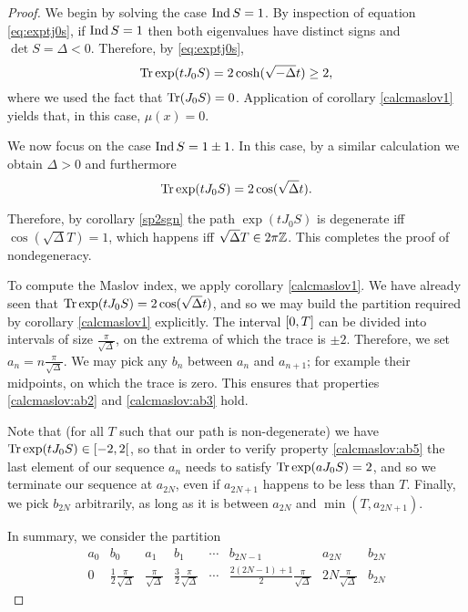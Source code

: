 \begin{proof}
We begin by solving the case $\operatorname{Ind} S = 1$. By inspection of equation \eqref{eq:exptj0s}, if $\operatorname{Ind} S = 1$ then both eigenvalues have distinct signs and $\det S = \Delta < 0$. Therefore, by \eqref{eq:exptj0s},
\begin{equation}
\operatorname{Tr} \exp(t J_0 S) = 2 \cosh(\sqrt{-\Delta} t) \geq 2,
\end{equation}
where we used the fact that $\operatorname{Tr}(J_0 S) = 0$. Application of corollary \ref{calcmaslov1} yields that, in this case, $\mu(x) = 0$.

We now focus on the case $\operatorname{Ind} S = 1 \pm 1$. In this case, by a similar calculation we obtain $\Delta > 0$ and furthermore
\begin{equation}
\operatorname{Tr} \exp(t J_0 S) = 2 \cos(\sqrt\Delta t).
\end{equation}

Therefore, by corollary \ref{sp2sgn} the path $\exp(t J_0 S)$ is degenerate iff $\cos(\sqrt \Delta T) = 1$, which happens iff $\sqrt\Delta T \in 2 \pi \mathbb{Z}$. This completes the proof of nondegeneracy.

\smallskip

To compute the Maslov index, we apply corollary \ref{calcmaslov1}. We have already seen that $\operatorname{Tr} \exp(t J_0 S) = 2 \cos(\sqrt\Delta t)$, and so we may build the partition required by corollary \ref{calcmaslov1} explicitly. The interval $\interval 0 T$ can be divided into intervals of size $\frac\pi{\sqrt\Delta}$, on the extrema of which the trace is $\pm 2$. Therefore, we set $a_n = n \frac\pi{\sqrt\Delta}$. We may pick any $b_n$ between $a_n$ and $a_{n+1}$; for example their midpoints, on which the trace is zero. This ensures that properties \ref{calcmaslov:ab2} and \ref{calcmaslov:ab3} hold.

Note that (for all $T$ such that our path is non-degenerate) we have $\trace \exp(t J_0 S) \in \rinterval{-2}2$, so that in order to verify property \ref{calcmaslov:ab5} the last element of our sequence $a_n$ needs to satisfy $\operatorname{Tr} \exp(a J_0 S) = 2$, and so we terminate our sequence at $a_{2N}$, even if $a_{2N+1}$ happens to be less than $T$. Finally, we pick $b_{2N}$ arbitrarily, as long as it is between $a_{2N}$ and $\min(T, a_{2N+1})$.

In summary, we consider the partition
\begin{equation}\label{autmaslov:thepartition}
\begin{array}{c|c|c|c|c|c|c|c}
a_0 & b_0 & a_1 & b_1
& \cdots &
b_{2N-1} & a_{2N} & b_{2N} \\
\hline
0 & \frac12 \frac{\pi}{\sqrt\Delta} & \frac{\pi}{\sqrt\Delta} & \frac32 \frac{\pi}{\sqrt\Delta}
& \cdots &
\frac{2(2N-1)+1}2 \frac{\pi}{\sqrt\Delta} & 2N \frac{\pi}{\sqrt\Delta} & b_{2N}
\end{array}
\end{equation}


\end{proof}
